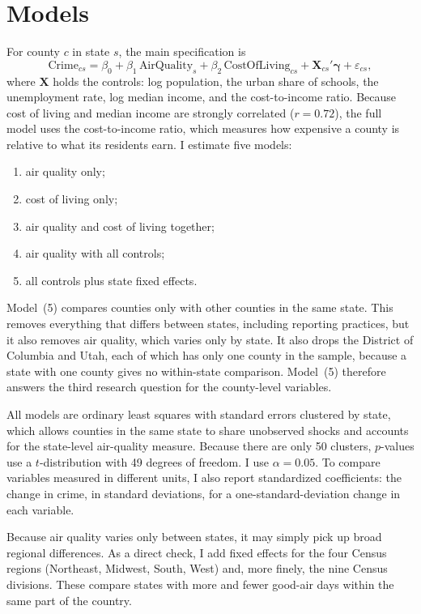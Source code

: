 \documentclass[12pt,letterpaper]{report}
\begin{document}
\section{Models}
For county $c$ in state $s$, the main specification is
\begin{equation}
\text{Crime}_{cs} = \beta_0 + \beta_1\,\text{AirQuality}_{s} + \beta_2\,\text{CostOfLiving}_{cs}
 + \mathbf{X}_{cs}'\boldsymbol{\gamma} + \varepsilon_{cs},
\end{equation}
where $\mathbf{X}$ holds the controls: log population, the urban share of schools, the
unemployment rate, log median income, and the cost-to-income ratio. Because cost of living
and median income are strongly correlated ($r=0.72$), the full model uses the cost-to-income
ratio, which measures how expensive a county is relative to what its residents earn. I
estimate five models:
\begin{enumerate}
\item[(1)] air quality only;
\item[(2)] cost of living only;
\item[(3)] air quality and cost of living together;
\item[(4)] air quality with all controls;
\item[(5)] all controls plus state fixed effects.
\end{enumerate}
Model~(5) compares counties only with other counties in the same state. This removes
everything that differs between states, including reporting practices, but it also removes
air quality, which varies only by state. It also drops the District of Columbia and Utah,
each of which has only one county in the sample, because a state with one county gives no
within-state comparison. Model~(5) therefore answers the third research
question for the county-level variables.

All models are ordinary least squares with standard errors clustered by state, which allows
counties in the same state to share unobserved shocks and accounts for the state-level
air-quality measure. Because there are only 50 clusters, $p$-values use a
$t$-distribution with 49 degrees of freedom. I use $\alpha = 0.05$. To compare variables measured in different units,
I also report standardized coefficients: the change in crime, in standard deviations, for a
one-standard-deviation change in each variable.

Because air quality varies only between states, it may simply pick up broad regional
differences. As a direct check, I add fixed effects for the four Census regions
(Northeast, Midwest, South, West) and, more finely, the nine Census divisions. These compare
states with more and fewer good-air days within the same part of the country.
\end{document}
